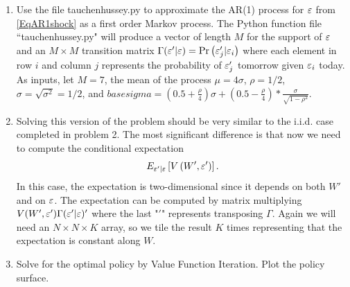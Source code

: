 \begin{problem}
\begin{enumerate}
   \item Use the file tauchenhussey.py to approximate the AR(1) process for $\varepsilon$ from \eqref{EqAR1shock} as a first order Markov process. The Python function file ``tauchenhussey.py" will produce a vector of length $M$ for the support of $\varepsilon$ and an $M\times M$ transition matrix $\Gamma(\varepsilon'|\varepsilon)=\text{Pr}\left(\varepsilon_j'|\varepsilon_i\right)$ where each element in row $i$ and column $j$ represents the probability of $\varepsilon_j'$ tomorrow given $\varepsilon_i$ today. As inputs, let $M=7$, the mean of the process $\mu=4\sigma$, $\rho = 1/2$, $\sigma=\sqrt{\sigma^2}=1/2$, and $basesigma=(0.5+\frac{\rho}{4})\sigma + (0.5 - \frac{\rho}{4})*\frac{\sigma}{\sqrt{1-\rho^2}}$.

  \item Solving this version of the problem should be very similar to the i.i.d. case completed in problem 2.  The most significant difference is that now we need to compute the conditional expectation
      \begin{equation}
      E_{\varepsilon'|\varepsilon}\left[V\left(W',\varepsilon'\right)\right].
      \end{equation}
      In this case, the expectation is two-dimensional since it depends on both $W'$ and on $\varepsilon$.  The expectation can be computed by matrix multiplying $V(W',\varepsilon')\Gamma(\varepsilon' | \varepsilon)'$ where the last "$'$" represents transposing $\Gamma$.  Again we will need an $N\times N\times K$ array, so we tile the result $K$ times representing that the expectation is constant along $W$.
      
  \item Solve for the optimal policy by Value Function Iteration.  Plot the policy surface.
      
  
\end{enumerate} 
\end{problem}